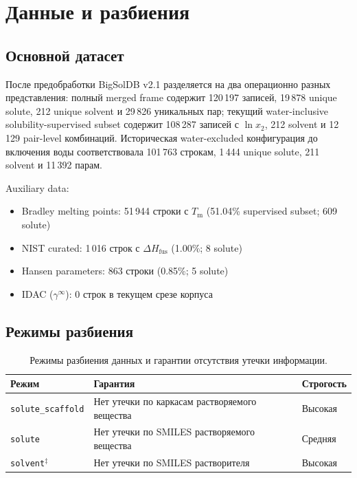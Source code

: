 \documentclass[11pt]{article}
\begin{document}
\section{Данные и разбиения}

\subsection{Основной датасет}

После предобработки BigSolDB v2.1 разделяется на два операционно разных представления: полный merged frame содержит 120\,197 записей, 19\,878 unique solute, 212 unique solvent и 29\,826 уникальных пар; текущий water-inclusive solubility-supervised subset содержит 108\,287 записей с $\ln x_2$, 212 solvent и 12\,129 pair-level комбинаций. Историческая water-excluded конфигурация до включения воды соответствовала 101\,763 строкам, 1\,444 unique solute, 211 solvent и 11\,392 парам.

Auxiliary data:
\begin{itemize}
  \item Bradley melting points: 51\,944 строки с $T_{\mathrm{m}}$ (51.04\% supervised subset; 609 solute)
  \item NIST curated: 1\,016 строк с $\Delta H_{\mathrm{fus}}$ (1.00\%; 8 solute)
  \item Hansen parameters: 863 строки (0.85\%; 5 solute)
  \item IDAC ($\gamma^\infty$): 0 строк в текущем срезе корпуса
\end{itemize}

\subsection{Режимы разбиения}

\begin{table}[H]
\centering
\begin{tabularx}{\textwidth}{|P{3.4cm}|Y|C{1.8cm}|}
\hline
Режим & Гарантия & Строгость \\
\hline
\texttt{solute\_scaffold} & Нет утечки по каркасам растворяемого вещества & Высокая \\
\hline
\texttt{solute} & Нет утечки по SMILES растворяемого вещества & Средняя \\
\hline
\texttt{solvent}$^{\ddagger}$ & Нет утечки по SMILES растворителя & Высокая \\
\hline
\end{tabularx}
\caption{Режимы разбиения данных и гарантии отсутствия утечки информации.}
\end{table}
\end{document}
